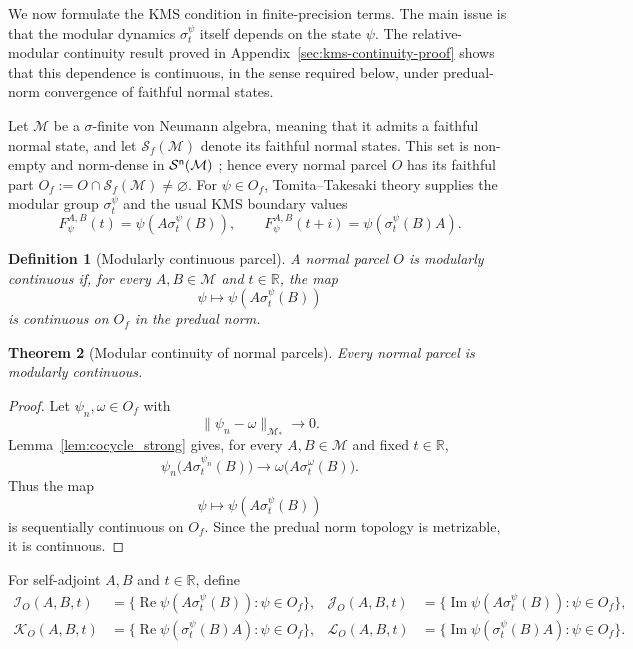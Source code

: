 \documentclass[11pt]{article}
\newtheorem{theorem}{Theorem}[section]
\newtheorem{definition}[theorem]{Definition}
\begin{document}
We now formulate the KMS condition in finite-precision terms. The main
issue is that the modular dynamics $\sigma_t^\psi$ itself depends on
the state $\psi$. The relative-modular continuity result proved in
Appendix~\ref{sec:kms-continuity-proof} shows that this dependence is
continuous, in the sense required below, under predual-norm convergence
of faithful normal states. 

Let $\mathcal M$ be a $\sigma$-finite von Neumann algebra, meaning that
it admits a faithful normal state, and let
$\mathcal S_f(\mathcal M)$ denote its faithful normal states. This set is
non-empty and norm-dense in $\mathcal S^{\sf n}(\mathcal M)$
\cite[Prop.~III.2.2]{Takesaki1}; hence every normal parcel $O$ has its faithful part
$O_f:=O\cap\mathcal S_f(\mathcal M)\neq\varnothing$. For
$\psi\in O_f$, Tomita--Takesaki theory supplies the modular group
$\sigma_t^\psi$ and the usual KMS boundary values
\[
F_\psi^{A,B}(t)=\psi(A\sigma_t^\psi(B)),
\qquad
F_\psi^{A,B}(t+i)=\psi(\sigma_t^\psi(B)A).
\]


\begin{definition}[Modularly continuous parcel]
\label{def:modcontinuous}
A normal parcel $O$ is \emph{modularly continuous} if, for every
$A,B\in\mathcal M$ and $t\in\mathbb R$, the map
\[
\psi\longmapsto\psi(A\sigma_t^\psi(B))
\]
is continuous on $O_f$ in the predual norm.
\end{definition}

\begin{theorem}[Modular continuity of normal parcels]
\label{thm:modular-continuity}
Every normal parcel is modularly continuous.
\end{theorem}

\begin{proof}
Let $\psi_n,\omega\in O_f$ with
\[
\|\psi_n-\omega\|_{\mathcal M_*}\longrightarrow0.
\]
Lemma~\ref{lem:cocycle_strong} gives, for every
$A,B\in\mathcal M$ and fixed $t\in\mathbb R$,
\[
\psi_n\bigl(A\sigma_t^{\psi_n}(B)\bigr)
\longrightarrow
\omega\bigl(A\sigma_t^\omega(B)\bigr).
\]
Thus the map
\[
\psi\longmapsto\psi(A\sigma_t^\psi(B))
\]
is sequentially continuous on $O_f$. Since the predual norm topology
is metrizable, it is continuous.
\end{proof}

For self-adjoint $A,B$ and $t\in\mathbb R$, define
\[
\begin{aligned}
\mathcal I_O(A,B,t)
&=\{\operatorname{Re}\psi(A\sigma_t^\psi(B)):\psi\in O_f\},&
\mathcal J_O(A,B,t)
&=\{\operatorname{Im}\psi(A\sigma_t^\psi(B)):\psi\in O_f\},\\
\mathcal K_O(A,B,t)
&=\{\operatorname{Re}\psi(\sigma_t^\psi(B)A):\psi\in O_f\},&
\mathcal L_O(A,B,t)
&=\{\operatorname{Im}\psi(\sigma_t^\psi(B)A):\psi\in O_f\}.
\end{aligned}
\]
\end{document}
